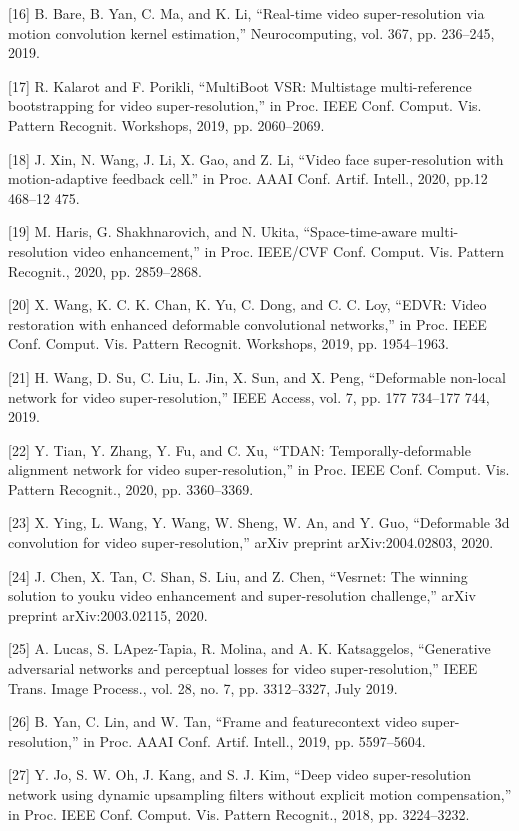 \documentclass[11pt,UTF8]{ctexart}
\begin{document}
[16] B. Bare, B. Yan, C. Ma, and K. Li, “Real-time video super-resolution via motion convolution kernel estimation,” Neurocomputing, vol. 367, pp. 236–245, 2019.

[17] R. Kalarot and F. Porikli, “MultiBoot VSR: Multistage multi-reference bootstrapping for video super-resolution,” in Proc. IEEE Conf. Comput. Vis. Pattern Recognit. Workshops, 2019, pp. 2060–2069.

[18] J. Xin, N. Wang, J. Li, X. Gao, and Z. Li, “Video face super-resolution with motion-adaptive feedback cell.” in Proc. AAAI Conf. Artif. Intell., 2020, pp.12 468–12 475.

[19] M. Haris, G. Shakhnarovich, and N. Ukita, “Space-time-aware multi-resolution video enhancement,” in Proc. IEEE/CVF Conf. Comput. Vis. Pattern Recognit., 2020, pp. 2859–2868.

[20] X. Wang, K. C. K. Chan, K. Yu, C. Dong, and C. C. Loy, “EDVR: Video restoration with enhanced deformable convolutional networks,” in Proc. IEEE Conf. Comput. Vis. Pattern Recognit. Workshops, 2019, pp. 1954–1963.

[21] H. Wang, D. Su, C. Liu, L. Jin, X. Sun, and X. Peng, “Deformable non-local network for video super-resolution,” IEEE Access, vol. 7, pp. 177 734–177 744, 2019.

[22] Y. Tian, Y. Zhang, Y. Fu, and C. Xu, “TDAN: Temporally-deformable alignment network for video super-resolution,” in Proc. IEEE Conf. Comput. Vis. Pattern Recognit., 2020, pp. 3360–3369.

[23] X. Ying, L. Wang, Y. Wang, W. Sheng, W. An, and Y. Guo, “Deformable 3d convolution for video super-resolution,” arXiv preprint arXiv:2004.02803, 2020.

[24] J. Chen, X. Tan, C. Shan, S. Liu, and Z. Chen, “Vesrnet: The winning solution to youku video enhancement and super-resolution challenge,” arXiv preprint arXiv:2003.02115, 2020.

[25] A. Lucas, S. LApez-Tapia, R. Molina, and A. K. Katsaggelos, “Generative adversarial networks and perceptual losses for video super-resolution,” IEEE Trans. Image Process., vol. 28, no. 7, pp. 3312–3327, July 2019.

[26] B. Yan, C. Lin, and W. Tan, “Frame and featurecontext video super-resolution,” in Proc. AAAI Conf. Artif. Intell., 2019, pp. 5597–5604.

[27] Y. Jo, S. W. Oh, J. Kang, and S. J. Kim, “Deep video super-resolution network using dynamic upsampling filters without explicit motion compensation,” in Proc. IEEE Conf. Comput. Vis. Pattern Recognit., 2018, pp. 3224–3232.
\end{document}
